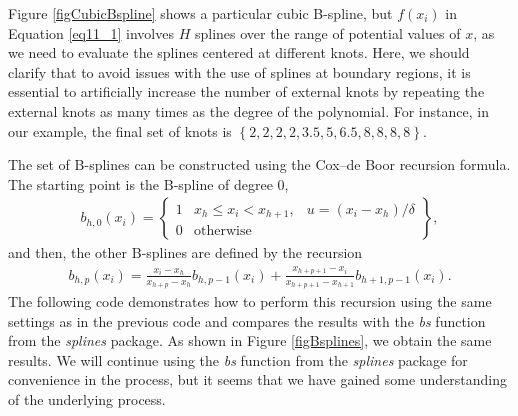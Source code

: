 Figure \ref{figCubicBspline} shows a particular cubic B-spline, but \( f(x_i) \) in Equation \ref{eq11_1} involves \( H \) splines over the range of potential values of \( x \), as we need to evaluate the splines centered at different knots. Here, we should clarify that to avoid issues with the use of splines at boundary regions, it is essential to artificially increase the number of external knots by repeating the external knots as many times as the degree of the polynomial. For instance, in our example, the final set of knots is \( \left\{2, 2, 2, 2, 3.5, 5, 6.5, 8, 8, 8, 8\right\} \). %

The set of B-splines can be constructed using the Cox–de Boor recursion formula. The starting point is the B-spline of degree 0,
\begin{align*}
		b_{h,0}(x_i)=\begin{Bmatrix}
		1 & x_h \leq x_i < x_{h+1}, & u=(x_i-x_h)/\delta\\
		0 & \text{otherwise}
	\end{Bmatrix},
\end{align*}
and then, the other B-splines are defined by the recursion
\begin{align}\label{eq11_2}
	b_{h,p}(x_i)=\frac{x_i-x_{h}}{x_{h+p}-x_h}b_{h,p-1}(x_i)+\frac{x_{h+p+1}-x_i}{x_{h+p+1}-x_{h+1}}b_{h+1,p-1}(x_i).
\end{align}
The following code demonstrates how to perform this recursion using the same settings as in the previous code and compares the results with the \textit{bs} function from the \textit{splines} package. As shown in Figure \ref{figBsplines}, we obtain the same results. We will continue using the \textit{bs} function from the \textit{splines} package for convenience in the process, but it seems that we have gained some understanding of the underlying process.

